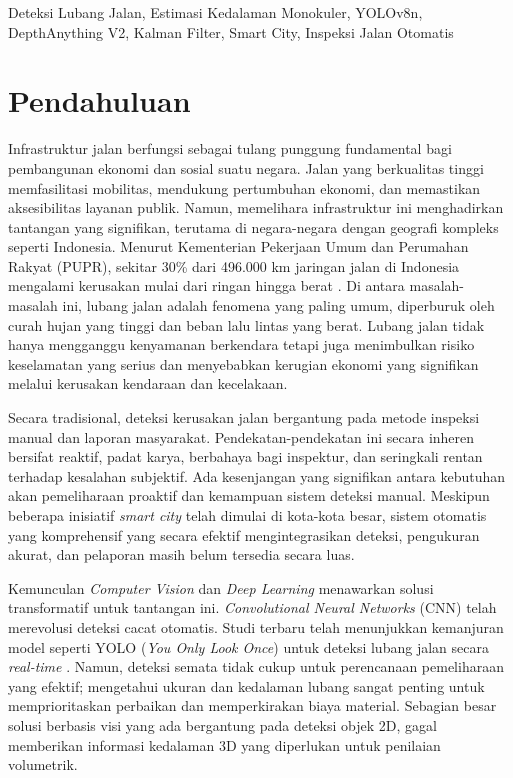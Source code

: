 \documentclass[conference]{IEEEtran}
\begin{document}
\begin{IEEEkeywords}
Deteksi Lubang Jalan, Estimasi Kedalaman Monokuler, YOLOv8n, DepthAnything V2, Kalman Filter, Smart City, Inspeksi Jalan Otomatis
\end{IEEEkeywords}

\section{Pendahuluan}
\label{sec:introduction}

Infrastruktur jalan berfungsi sebagai tulang punggung fundamental bagi pembangunan ekonomi dan sosial suatu negara. Jalan yang berkualitas tinggi memfasilitasi mobilitas, mendukung pertumbuhan ekonomi, dan memastikan aksesibilitas layanan publik. Namun, memelihara infrastruktur ini menghadirkan tantangan yang signifikan, terutama di negara-negara dengan geografi kompleks seperti Indonesia. Menurut Kementerian Pekerjaan Umum dan Perumahan Rakyat (PUPR), sekitar 30\% dari 496.000 km jaringan jalan di Indonesia mengalami kerusakan mulai dari ringan hingga berat \cite{kemenpupr}. Di antara masalah-masalah ini, lubang jalan adalah fenomena yang paling umum, diperburuk oleh curah hujan yang tinggi dan beban lalu lintas yang berat. Lubang jalan tidak hanya mengganggu kenyamanan berkendara tetapi juga menimbulkan risiko keselamatan yang serius dan menyebabkan kerugian ekonomi yang signifikan melalui kerusakan kendaraan dan kecelakaan.

Secara tradisional, deteksi kerusakan jalan bergantung pada metode inspeksi manual dan laporan masyarakat. Pendekatan-pendekatan ini secara inheren bersifat reaktif, padat karya, berbahaya bagi inspektur, dan seringkali rentan terhadap kesalahan subjektif. Ada kesenjangan yang signifikan antara kebutuhan akan pemeliharaan proaktif dan kemampuan sistem deteksi manual. Meskipun beberapa inisiatif \textit{smart city} telah dimulai di kota-kota besar, sistem otomatis yang komprehensif yang secara efektif mengintegrasikan deteksi, pengukuran akurat, dan pelaporan masih belum tersedia secara luas.

Kemunculan \textit{Computer Vision} dan \textit{Deep Learning} menawarkan solusi transformatif untuk tantangan ini. \textit{Convolutional Neural Networks} (CNN) telah merevolusi deteksi cacat otomatis. Studi terbaru telah menunjukkan kemanjuran model seperti YOLO (\textit{You Only Look Once}) untuk deteksi lubang jalan secara \textit{real-time} \cite{gorro2024}. Namun, deteksi semata tidak cukup untuk perencanaan pemeliharaan yang efektif; mengetahui ukuran dan kedalaman lubang sangat penting untuk memprioritaskan perbaikan dan memperkirakan biaya material. Sebagian besar solusi berbasis visi yang ada bergantung pada deteksi objek 2D, gagal memberikan informasi kedalaman 3D yang diperlukan untuk penilaian volumetrik.
\end{document}
